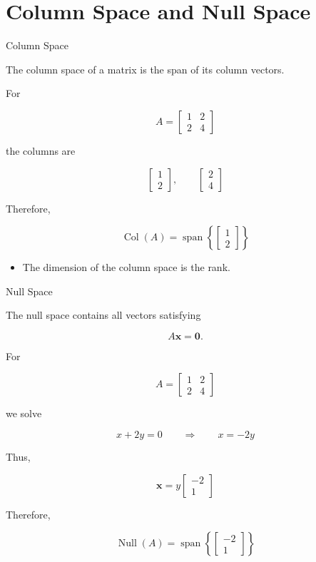 \documentclass[aspectratio=169]{beamer}
\begin{document}
\section{Column Space and Null Space}

\begin{frame}{Column Space}
\small

The column space of a matrix is the span of its column vectors.

For

$$
A=
\begin{bmatrix}
1&2\\
2&4
\end{bmatrix}
$$

the columns are

$$
\begin{bmatrix}
1\\
2
\end{bmatrix},
\qquad
\begin{bmatrix}
2\\
4
\end{bmatrix}
$$

Therefore,

$$
\operatorname{Col}(A)
=
\operatorname{span}
\left\{
\begin{bmatrix}
1\\
2
\end{bmatrix}
\right\}
$$

\begin{itemize}
\item The dimension of the column space is the rank.
\end{itemize}

\end{frame}

\begin{frame}{Null Space}
\small

The null space contains all vectors satisfying

$$
A\mathbf{x}=\mathbf{0}.
$$

For

$$
A=
\begin{bmatrix}
1&2\\
2&4
\end{bmatrix}
$$

we solve

$$
x+2y=0
\qquad\Rightarrow\qquad
x=-2y
$$

Thus,

$$
\mathbf{x}
=
y
\begin{bmatrix}
-2\\
1
\end{bmatrix}
$$

Therefore,

$$
\operatorname{Null}(A)
=
\operatorname{span}
\left\{
\begin{bmatrix}
-2\\
1
\end{bmatrix}
\right\}
$$

\end{frame}
\end{document}

